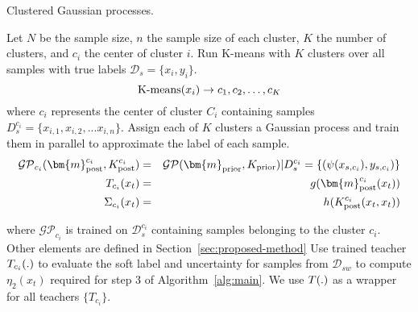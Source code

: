 \begin{algorithm}[t!]
\caption{Clustered Gaussian processes.}%
\begin{algorithmic}[1]
\label{alg:CGP}
\State Let $N$ be the sample size, $n$ the sample size of each cluster, $K$ the number of clusters, and $c_i$ the center of cluster $i$.
\medskip
\State Run K-means with $K$ clusters over all samples with true labels $\mathcal{D}_s=\{x_i,y_i\}$.
\begin{equation*}
    {\rm K\mbox{-}means}({x_i}) \rightarrow {c_1, c_2, \ldots, c_K}
\end{equation*}
where $c_i$ represents the center of cluster $C_i$ containing samples $D_s^{c_i}=\{x_{i,1}, x_{i,2}, ... x_{i,n}\}$.
\medskip
\State Assign each of $K$ clusters a Gaussian process and train them in parallel to approximate the label of each sample.
\begin{eqnarray*}
\mathcal{GP}_{c_i}(\bm{m}_{\rm post}^{c_i}, K_{\rm post}^{c_i})&=&\mathcal{GP}(\bm{m}_{\rm prior}, K_{\rm prior}) | D_s^{c_i}=\{(\psi(x_{s,c_i}),y_{s,c_i})\}\\
\tfunc_{c_i}(x_t) &=& g(\bm{m}_{\rm post}^{c_i}(x_t))\\
\Sigma_{c_i}(x_t) &=& h(K_{\rm post}^{c_i}(x_t,x_t))
\end{eqnarray*}




where $\mathcal{GP}_{c_i}$ is trained on $\mathcal{D}_s^{c_i}$ containing samples belonging to the cluster $c_i$. Other elements are defined in Section~\ref{sec:proposed-method}
\medskip
\State Use trained teacher $T_{c_i}(.)$ to evaluate the soft label and uncertainty for samples from $\mathcal{D}_{sw}$ to compute $\eta_2(x_t)$ required for step 3 of Algorithm~\ref{alg:main}. We use $T(.)$ as a wrapper for all teachers $\{T_{c_i}\}$.
\end{algorithmic}
\end{algorithm}
\shrink
